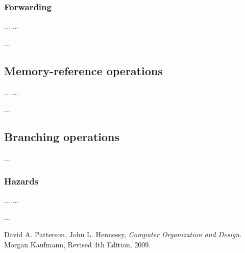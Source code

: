 \documentclass[11pt,twoside,a4paper]{article}
\begin{document}
\subsubsection{Forwarding}
\begin{multicols}{2}
\noindent ...
\vfill
\columnbreak
...
\lstset{language=[mips]Assembler}

...
\end{multicols}

\subsection{Memory-reference operations}
\begin{multicols}{2}
\noindent ...
\vfill
\columnbreak
...
\lstset{language=[mips]Assembler}

...
\end{multicols}

\subsection{Branching operations}
...

\subsubsection{Hazards}
\begin{multicols}{2}
\noindent ...
\vfill
\columnbreak
...
\lstset{language=[mips]Assembler}

...
\end{multicols}

\newpage
\pagestyle{fancy}
\begin{thebibliography}{9}

  David A. Patterson, John L. Hennessy,
  \emph{Computer Organization and Design}.
  Morgan Kaufmann,
  Revised 4th Edition,
  2009.

\end{thebibliography}
\end{document}
